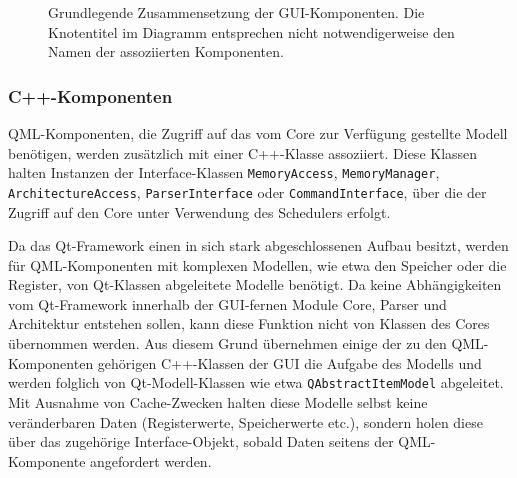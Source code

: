 \begin{figure}[H]
	\centering
	\caption{Grundlegende Zusammensetzung der GUI-Komponenten. Die Knotentitel im
	Diagramm entsprechen nicht notwendigerweise den Namen der assoziierten
	Komponenten.}
	\label{fig:gui-composition}
\end{figure}

\subsubsection{C++-Komponenten}

QML-Komponenten, die Zugriff auf das vom Core zur Verfügung gestellte Modell
benötigen, werden zusätzlich mit einer C++-Klasse assoziiert. Diese Klassen
halten Instanzen der Interface-Klassen \texttt{MemoryAccess},
\texttt{MemoryManager}, \texttt{ArchitectureAccess}, \texttt{ParserInterface}
oder \texttt{CommandInterface}, über die der Zugriff auf den Core unter
Verwendung des Schedulers erfolgt.

Da das Qt-Framework einen in sich stark abgeschlossenen Aufbau besitzt, werden
für QML-Komponenten mit komplexen Modellen, wie etwa den Speicher oder die
Register, von Qt-Klassen abgeleitete Modelle benötigt. Da keine Abhängigkeiten
vom Qt-Framework innerhalb der GUI-fernen Module Core, Parser und Architektur
entstehen sollen, kann diese Funktion nicht von Klassen des Cores übernommen
werden. Aus diesem Grund übernehmen einige der zu den QML-Komponenten gehörigen
C++-Klassen der GUI die Aufgabe des Modells und werden folglich von
Qt-Modell-Klassen wie etwa \texttt{QAbstractItemModel} abgeleitet. Mit Ausnahme
von Cache-Zwecken halten diese Modelle selbst keine veränderbaren Daten
(Registerwerte, Speicherwerte etc.), sondern holen diese über das zugehörige
Interface-Objekt, sobald Daten seitens der QML-Komponente angefordert werden.

